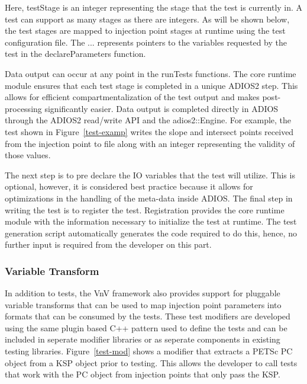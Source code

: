 Here, testStage is an integer representing the stage that the test is currently in. A test can support as many stages as there are integers. As will be shown below, the test 
stages are mapped to injection point stages at runtime using the test configuration file. The ... represents pointers to the variables requested by the test in the 
declareParameters function. 

Data output can occur at any point in the runTests functions. The core runtime module ensures that each test stage is completed in a unique ADIOS2 step. This allows for efficient 
compartmentalization of the test output and makes post-processing significantly easier. Data output is completed directly in ADIOS through the 
ADIOS2 read/write API and the adios2::Engine. For example, the test shown in Figure~\ref{test-examp} writes the slope and intersect points received from the injection point
to file along with an integer representing the validity of those values. 

The next step is to pre declare the IO variables that the test will utilize. This is optional, however, it is considered best practice because it allows for optimizations 
in the handling of the meta-data inside ADIOS. The final step in writing the test is to register the test. Registration provides the core runtime module with the information 
necessary to initialize the test at runtime. The test generation script automatically generates the code required to do this, 
hence, no further input is required from the developer on this part. 

\subsubsection{Variable Transform}

In addition to tests, the VnV framework also provides support for pluggable variable transforms that can be used to 
map injection point parameters into formats that can be consumed by the tests. These test modifiers are developed using 
the same plugin based C++ pattern used to define the tests and can be included in seperate modifier libraries or as seperate 
components in existing testing libraries. Figure~\ref{test-mod} shows
a modifier that extracts a PETSc PC object from a KSP object prior to testing. This allows the developer to call tests that work with the PC object from
injection points that only pass the KSP. 

